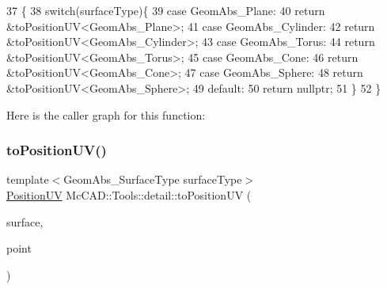 \begin{DoxyCode}
37                                                             \{
38     \textcolor{keywordflow}{switch}(surfaceType)\{
39     \textcolor{keywordflow}{case} GeomAbs\_Plane:
40         \textcolor{keywordflow}{return} &toPositionUV<GeomAbs\_Plane>;
41     \textcolor{keywordflow}{case} GeomAbs\_Cylinder:
42         \textcolor{keywordflow}{return} &toPositionUV<GeomAbs\_Cylinder>;
43     \textcolor{keywordflow}{case} GeomAbs\_Torus:
44         \textcolor{keywordflow}{return} &toPositionUV<GeomAbs\_Torus>;
45     \textcolor{keywordflow}{case} GeomAbs\_Cone:
46         \textcolor{keywordflow}{return} &toPositionUV<GeomAbs\_Cone>;
47     \textcolor{keywordflow}{case} GeomAbs\_Sphere:
48         \textcolor{keywordflow}{return} &toPositionUV<GeomAbs\_Sphere>;
49     \textcolor{keywordflow}{default}:
50         \textcolor{keywordflow}{return} \textcolor{keyword}{nullptr};
51     \}
52 \}
\end{DoxyCode}
Here is the caller graph for this function\+:
\mbox{\label{namespaceMcCAD_1_1Tools_1_1detail_a8d54cda4879b503acfb373d66202dc3b}} 
\subsubsection{\texorpdfstring{to\+Position\+U\+V()}{toPositionUV()}}
{\footnotesize\ttfamily template$<$Geom\+Abs\+\_\+\+Surface\+Type surface\+Type$>$ \\
\hyperlink{structMcCAD_1_1Tools_1_1PositionUV}{Position\+UV} Mc\+C\+A\+D\+::\+Tools\+::detail\+::to\+Position\+UV (\begin{DoxyParamCaption}\item[{const B\+Rep\+Adaptor\+\_\+\+Surface \&}]{surface,  }\item[{const gp\+\_\+\+Pnt \&}]{point }\end{DoxyParamCaption})}

